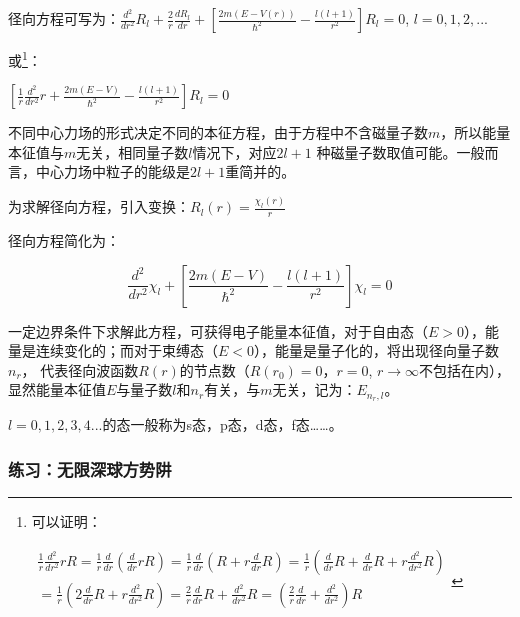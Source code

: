 径向方程可写为：$\frac{{d^2 }}{{dr^2 }}R_l  + \frac{2}{r}\frac{{dR_l }}{{dr}} + \left[ {\frac{{2m\left( {E - V(r)} \right)}}{{\hbar ^2 }} - \frac{{l\left( {l + 1} \right)}}{{r^2 }}} \right]R_l  = 0$, $l = 0,1,2,...$


或\footnote{可以证明：

$\begin{array}{l}
 \frac{1}{r}\frac{{d^2 }}{{dr^2 }}rR = \frac{1}{r}\frac{d}{{dr}}\left( {\frac{d}{{dr}}rR} \right) = \frac{1}{r}\frac{d}{{dr}}\left( {R + r\frac{d}{{dr}}R} \right) = \frac{1}{r}\left( {\frac{d}{{dr}}R + \frac{d}{{dr}}R + r\frac{{d^2 }}{{dr^2 }}R} \right) \\
  = \frac{1}{r}\left( {2\frac{d}{{dr}}R + r\frac{{d^2 }}{{dr^2 }}R} \right) = \frac{2}{r}\frac{d}{{dr}}R + \frac{{d^2 }}{{dr^2 }}R = \left( {\frac{2}{r}\frac{d}{{dr}} + \frac{{d^2 }}{{dr^2 }}} \right)R \\
 \end{array}$}：

$\left[ {\frac{1}{r}\frac{{d^2 }}{{dr^2 }}r + \frac{{2m\left( {E -
V} \right)}}{{\hbar ^2 }} - \frac{{l\left( {l + 1} \right)}}{{r^2
}}} \right]R_l  = 0$


不同中心力场的形式决定不同的本征方程，由于方程中不含磁量子数$m$，所以能量本征值与$m$无关，相同量子数$l$情况下，对应$2l+1$ 种磁量子数取值可能。一般而言，中心力场中粒子的能级是$2l+1$重简并的。

为求解径向方程，引入变换：$R_l (r) = \frac{{\chi _l (r)}}{r}$

径向方程简化为：

\begin{equation}\label{15-8}
\frac{{d^2 }}{{dr^2 }}\chi _l  + \left[ {\frac{{2m\left( {E - V} \right)}}{{\hbar ^2 }} - \frac{{l\left( {l + 1} \right)}}{{r^2 }}} \right]\chi _l  = 0
\end{equation}

一定边界条件下求解此方程，可获得电子能量本征值，对于自由态（$E>0$），能量是连续变化的；而对于束缚态（$E<0$），能量是量子化的，将出现径向量子数$n_r$， 代表径向波函数$R(r)$的节点数（$R(r_0)=0$，$r=0$, $r \rightarrow \infty$不包括在内），显然能量本征值$E$与量子数$l$和$n_r$有关，与$m$无关，记为：$E_{n_r,l}$。

$l=0,1,2,3,4...$的态一般称为s态，p态，d态，f态……。

\subsubsection*{练习：无限深球方势阱}

